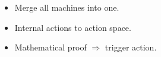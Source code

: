 \documentclass[aspectratio=169]{beamer}
\begin{document}
\begin{frame}[fragile]
\begin{columns}[T]
    \vrule{}

    \begin{column}{8cm}
      \begin{itemize}
      \item<6-> Merge all machines into one.
      \item<7-> Internal actions to action space.
      \item<8-> Mathematical proof $\Rightarrow$ trigger action.
      \end{itemize}
      \begin{center}
      \end{center}
    \end{column}
  \end{columns}

\end{frame}
\end{document}
